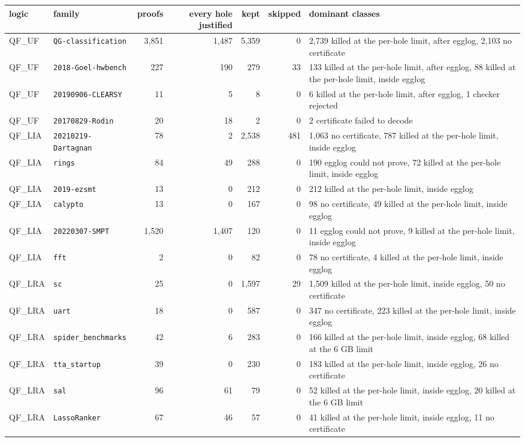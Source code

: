 \begin{tabular}{llrrrrp{6.2cm}}
\toprule
logic & family & proofs & every hole justified & kept & skipped & dominant classes \\
\midrule
QF\_UF & \texttt{QG-classification} & 3,851 & 1,487 & 5,359 & 0 & 2,739 killed at the per-hole limit, after egglog, 2,103 no certificate \\
QF\_UF & \texttt{2018-Goel-hwbench} & 227 & 190 & 279 & 33 & 133 killed at the per-hole limit, after egglog, 88 killed at the per-hole limit, inside egglog \\
QF\_UF & \texttt{20190906-CLEARSY} & 11 & 5 & 8 & 0 & 6 killed at the per-hole limit, after egglog, 1 checker rejected \\
QF\_UF & \texttt{20170829-Rodin} & 20 & 18 & 2 & 0 & 2 certificate failed to decode \\
\midrule
QF\_LIA & \texttt{20210219-Dartagnan} & 78 & 2 & 2,538 & 481 & 1,063 no certificate, 787 killed at the per-hole limit, inside egglog \\
QF\_LIA & \texttt{rings} & 84 & 49 & 288 & 0 & 190 egglog could not prove, 72 killed at the per-hole limit, inside egglog \\
QF\_LIA & \texttt{2019-ezsmt} & 13 & 0 & 212 & 0 & 212 killed at the per-hole limit, inside egglog \\
QF\_LIA & \texttt{calypto} & 13 & 0 & 167 & 0 & 98 no certificate, 49 killed at the per-hole limit, inside egglog \\
QF\_LIA & \texttt{20220307-SMPT} & 1,520 & 1,407 & 120 & 0 & 11 egglog could not prove, 9 killed at the per-hole limit, inside egglog \\
QF\_LIA & \texttt{fft} & 2 & 0 & 82 & 0 & 78 no certificate, 4 killed at the per-hole limit, inside egglog \\
\midrule
QF\_LRA & \texttt{sc} & 25 & 0 & 1,597 & 29 & 1,509 killed at the per-hole limit, inside egglog, 50 no certificate \\
QF\_LRA & \texttt{uart} & 18 & 0 & 587 & 0 & 347 no certificate, 223 killed at the per-hole limit, inside egglog \\
QF\_LRA & \texttt{spider\_benchmarks} & 42 & 6 & 283 & 0 & 166 killed at the per-hole limit, inside egglog, 68 killed at the 6 GB limit \\
QF\_LRA & \texttt{tta\_startup} & 39 & 0 & 230 & 0 & 183 killed at the per-hole limit, inside egglog, 26 no certificate \\
QF\_LRA & \texttt{sal} & 96 & 61 & 79 & 0 & 52 killed at the per-hole limit, inside egglog, 20 killed at the 6 GB limit \\
QF\_LRA & \texttt{LassoRanker} & 67 & 46 & 57 & 0 & 41 killed at the per-hole limit, inside egglog, 11 no certificate \\
\bottomrule
\end{tabular}
